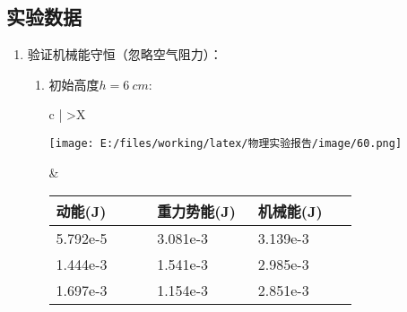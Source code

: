 \documentclass[UTF8]{article}
\begin{document}
        \subsection{实验数据}
            \begin{enumerate}
                \item 验证机械能守恒（忽略空气阻力）：
                    \begin{enumerate}[left=2em, label=\arabic*)]
                        \item 初始高度$h=\SI{6}{cm}$:
                            \begin{table}[H]
                                \centering
                                \begin{tabularx}{\textwidth}{
                                    c |
                                    >{\centering\arraybackslash}X
                                }
                                \hline
                                \begin{minipage}{0.45\textwidth}
                                    \centering
                                    \texttt{[image: E:/files/working/latex/物理实验报告/image/60.png]}
                                \end{minipage}
                                &
                                \begin{minipage}{\linewidth}
                                    \begin{tabular}{
                                        || >{\centering\arraybackslash}p{0.248\linewidth}
                                        | >{\centering\arraybackslash}p{0.248\linewidth}
                                        | >{\centering\arraybackslash}p{0.248\linewidth}
                                        ||
                                    }
                                        \hline
                                        动能(J) & 重力势能(J) & 机械能(J)\\ \hline
                                        5.792e-5 & 3.081e-3 & 3.139e-3 \\ \hline
                                        1.444e-3 & 1.541e-3 & 2.985e-3 \\ \hline
                                        1.697e-3 & 1.154e-3 & 2.851e-3\\ \hline
                                    \end{tabular}                                    
                                \end{minipage}


\end{tabularx}
\end{table}
\end{enumerate}
\end{enumerate}
\end{document}
